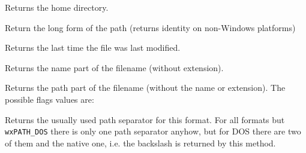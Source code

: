 
Returns the home directory.


\label{wxfilenamegetlongpath}


Return the long form of the path (returns identity on non-Windows platforms)


\label{wxfilenamegetmodificationtime}


Returns the last time the file was last modified.


\label{wxfilenamegetname}


Returns the name part of the filename (without extension).





\label{wxfilenamegetpath}


Returns the path part of the filename (without the name or extension). The
possible flags values are:

\twocolwidtha{5cm}
\begin{twocollist}\itemsep=0pt
\end{twocollist}


\label{wxfilenamegetpathseparator}


Returns the usually used path separator for this format. For all formats but 
{\tt wxPATH\_DOS} there is only one path separator anyhow, but for DOS there
are two of them and the native one, i.e. the backslash is returned by this
method.

